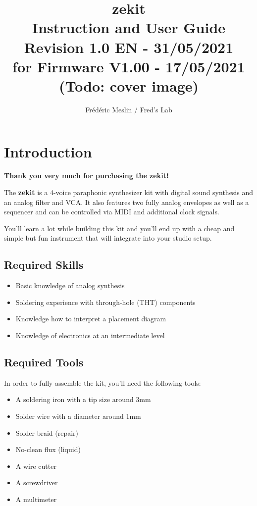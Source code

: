 \documentclass{scrartcl}
\title{
    \vspace*{4cm}
    \huge{zekit} \\
    Instruction and User Guide \\
    \vspace*{0.25cm}
    \small{Revision 1.0 EN - 31/05/2021} \\
    \small{for Firmware V1.00 - 17/05/2021} \\
    \vspace*{0.5cm}
    (Todo: cover image)
}
\author{Frédéric Meslin / Fred's Lab}
\begin{document}
\maketitle

\pagebreak


\tableofcontents
\pagebreak


\section{Introduction}

\textbf{Thank you very much for purchasing the zekit!}

The \textbf{zekit} is a 4-voice paraphonic synthesizer kit with digital sound synthesis and an analog filter and VCA. It also features two fully analog envelopes as well as a sequencer and can be controlled via MIDI and additional clock signals.

You'll learn a lot while building this kit and you'll end up with a cheap and simple but fun instrument that will integrate into your studio setup.

\subsection{Required Skills}

\begin{itemize}
    \item Basic knowledge of analog synthesis
    \item Soldering experience with through-hole (THT) components
    \item Knowledge how to interpret a placement diagram
    \item Knowledge of electronics at an intermediate level
\end{itemize}

\subsection{Required Tools}

In order to fully assemble the kit, you'll need the following tools:

\begin{itemize}
    \item A soldering iron with a tip size around 3mm
    \item Solder wire with a diameter around 1mm
    \item Solder braid (repair)
    \item No-clean flux (liquid)
    \item A wire cutter
    \item A screwdriver
    \item A multimeter
\end{itemize}
\end{document}
